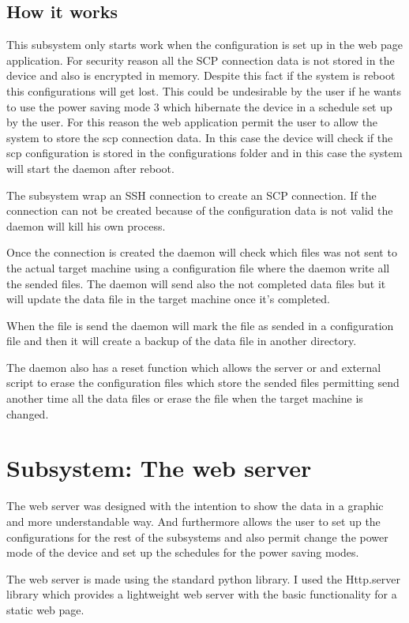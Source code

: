 		\subsection{How it works}
		This subsystem only starts work when the configuration is set up in the web page application. For security reason all the SCP connection data is not stored in the device and also is encrypted in memory. Despite this fact if the system is reboot this configurations will get lost. This could be undesirable by the user if he wants to use the power saving mode 3 which hibernate the device in a schedule set up by the user. For this reason the web application permit the user to allow the system to store the scp connection data. In this case the device will check if the scp configuration is stored in the configurations folder and in this case the system will start the daemon after reboot.

		The subsystem wrap an SSH connection to create an SCP connection. If the connection can not be created because of the configuration data is not valid the daemon will kill his own process.

		Once the connection is created the daemon will check which files was not sent to the actual target machine using a configuration file where the daemon write all the sended files. The daemon will send also the not completed data files but it will update the data file in the target machine once it's completed.

		When the file is send the daemon will mark the file as sended in a configuration file and then it will create a backup of the data file in another directory.

		The daemon also has a reset function which allows the server or and external script to erase the configuration files which store the sended files permitting send another time all the data files or erase the file when the target machine is changed.

	\section{Subsystem: The web server}
	The web server was designed with the intention to show the data in a graphic and more understandable way. And furthermore allows the user to set up the configurations for the rest of the subsystems and also permit change the power mode of the device and set up the schedules for the power saving modes.

	The web server is made using the standard python library. I used the Http.server library which provides a lightweight web server with the basic functionality for a static web page.


